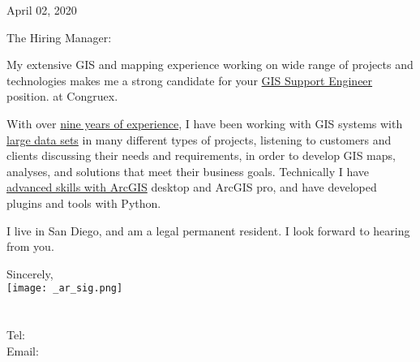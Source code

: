 \documentclass[letterpaper]{article}
\newcommand{\CVjobTitle}{GIS Support Engineer}
\newcommand{\CVcompany}{Congruex}
\newcommand{\impt}[1]{\uline{#1}}
\begin{document}
\large

\null\hfill April 02, 2020
\vspace{1em}

The Hiring Manager:

My extensive GIS and mapping experience working on wide range of projects and
technologies makes me a strong candidate for your \impt{\CVjobTitle} position.
at \CVcompany.

With over \impt{nine years of experience}, I have been working with GIS systems
with \impt{large data sets} in many different types of projects, listening to customers
and clients discussing their needs and requirements, in order to develop GIS
maps, analyses, and solutions that meet their business goals.  Technically I
have \impt{advanced skills with ArcGIS} desktop and ArcGIS pro, and have developed
plugins and tools with Python.


I live in San Diego, and am a legal permanent resident.  
I look forward to hearing from you.  



Sincerely,\\
\hspace{1em} \texttt{[image: \_ar\_sig.png]} \\
\CVname \\
\small
\CVaddress \\
Tel: \CVphone \\
Email: \CVemail
\end{document}
